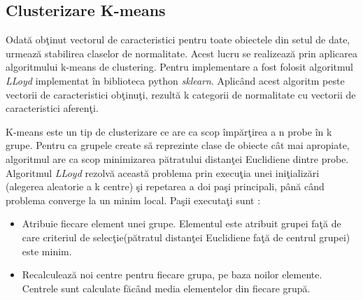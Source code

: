 \documentclass[a4paper,12pt]{report}
\begin{document}
\subsection{Clusterizare K-means}
\quad Odată obţinut vectorul de caracteristici pentru toate obiectele din setul de date, urmează stabilirea claselor de normalitate. Acest lucru se realizează prin aplicarea algoritmului k-means de clustering. Pentru implementare a fost folosit algoritmul \emph{LLoyd} implementat în biblioteca python \emph{sklearn}. Aplicând acest algoritm peste vectorii de caracteristici obţinuţi, rezultă k categorii de normalitate cu vectorii de caracteristici aferenţi. 
\par K-means este un tip de clusterizare ce are ca scop împărţirea a n probe în k grupe. Pentru ca grupele create să reprezinte clase de obiecte cât mai apropiate, algoritmul are ca scop minimizarea pătratului distanţei Euclidiene dintre probe. Algoritmul \emph{LLoyd} rezolvă această problema prin execuţia unei iniţializări (alegerea aleatorie a k centre) şi repetarea a doi paşi principali, până când problema converge la un minim local. Paşii executaţi sunt : 
\begin{itemize}
\item Atribuie fiecare element unei grupe. Elementul este atribuit grupei faţă de care criteriul de selecţie(pătratul distanţei Euclidiene faţă de centrul grupei) este minim.
\item Recalculează noi centre pentru fiecare grupa, pe baza noilor elemente. Centrele sunt calculate făcând media elementelor din fiecare grupă. 
\end{itemize}
\end{document}

